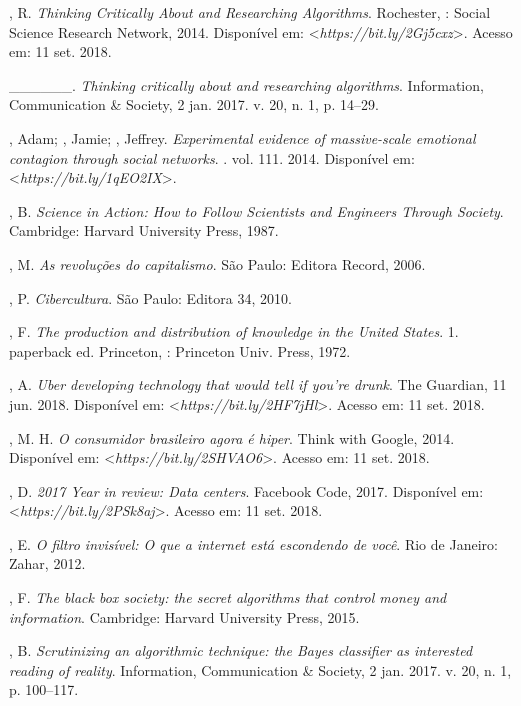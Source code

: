 \begin{Parskip}
, R. \emph{Thinking Critically About and Researching
Algorithms}. Rochester, : Social Science Research Network, 2014.
Disponível em: \textless{}\emph{https://bit.ly/2Gj5cxz}\textgreater{}. Acesso em: 11 set. 2018.

\_\_\_\_\_\_. \emph{Thinking critically about and researching
algorithms}. Information, Communication \& Society, 2 jan. 2017. v. 20,
n. 1, p. 14--29.

, Adam; , Jamie; , Jeffrey. \emph{Experimental evidence of massive-scale emotional contagion through social networks}. . vol.
111. 2014. Disponível em: \textless{}\emph{https://bit.ly/1qEO2IX}\textgreater{}.

, B. \emph{Science in Action: How to Follow Scientists and
Engineers Through Society}. Cambridge: Harvard University Press, 1987.

, M. \emph{As revoluções do capitalismo}. São Paulo: Editora
Record, 2006.

, P. \emph{Cibercultura}. São Paulo: Editora 34, 2010.

, F. \emph{The production and distribution of knowledge in the
United States}. 1. paperback ed. Princeton, : Princeton Univ.
Press, 1972.

, A. \emph{Uber developing technology that would tell if you're
drunk}. The Guardian, 11 jun. 2018. Disponível em: \textless{}\emph{https://bit.ly/2HF7jHl}\textgreater{}.
Acesso em: 11 set. 2018.

, M. H. \emph{O consumidor brasileiro agora é hiper}. Think
with Google, 2014. Disponível em: \textless{}\emph{https://bit.ly/2SHVAO6}\textgreater{}.
Acesso em: 11 set. 2018.

, D. \emph{2017 Year in review: Data centers}. Facebook Code,
2017. Disponível em: \textless{}\emph{https://bit.ly/2PSk8aj}\textgreater{}. Acesso em: 11 set. 2018.

, E. \emph{O filtro invisível: O que a internet está escondendo
de você}. Rio de Janeiro: Zahar, 2012.

, F. \emph{The black box society: the secret algorithms that
control money and information}. Cambridge: Harvard University Press,
2015.

, B. \emph{Scrutinizing an algorithmic technique: the Bayes
classifier as interested reading of reality}. Information, Communication
\& Society, 2 jan. 2017. v. 20, n. 1, p. 100--117.


\end{Parskip}
